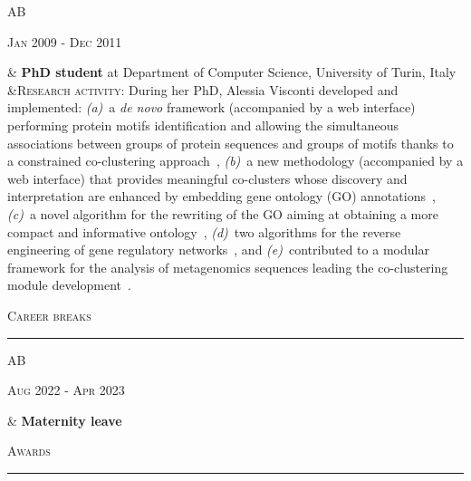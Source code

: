 \documentclass[a4paper,10pt]{article}
\newcommand{\mediumtitle}[1]{
	\vspace{0.2cm}
	{\noindent
	\Large \textsc{#1}\\[-2ex]
	\hrule
	\vspace{0.2cm}}
}
\newenvironment{doubletablelist}
{
	\vspace{-0.2cm}
	\begin{longtable}[!h]{AB}}{\end{longtable}
}
\newcommand{\dtlist}[2]{
\hspace{-3cm}
\noindent
	\begin{minipage}{0.22\textwidth}
	\begin{flushright}
	\textsc{#1}
	\end{flushright}
	\end{minipage}
	& #2\\[0.2cm]
}
\begin{document}
\begin{doubletablelist}
	\dtlist{Jan 2009 - Dec 2011}{\textbf{PhD student} at Department of Computer Science, University of Turin, Italy \\
	  &\textsc{Research activity}: During her PhD, Alessia Visconti developed and implemented: \emph{(a)}~a \emph{de novo} framework (accompanied by a web interface) performing protein motifs identification and allowing the simultaneous associations between groups of protein sequences and groups of motifs thanks to a constrained co-clustering approach~\cite{Cor09a}, \emph{(b)}~a new methodology (accompanied by a web interface) that provides meaningful co-clusters whose discovery and interpretation are enhanced by embedding gene ontology (GO) annotations~\cite{Vis11c,Cor09b}, \emph{(c)}~a novel algorithm for the rewriting of the GO aiming at obtaining a more compact and informative ontology~\cite{Vis11a,Vis10a}, \emph{(d)}~two algorithms for the reverse engineering of gene regulatory networks~\cite{Vis11b,Mar12,Vis12b}, and \emph{(e)}~contributed to a modular framework for the analysis of metagenomics sequences leading the co-clustering module development~\cite{Bon11}. %
	}
\end{doubletablelist}

\mediumtitle{Career breaks}
\begin{doubletablelist}
    \dtlist{Aug 2022 - Apr 2023}{\textbf{Maternity leave}
	}
\end{doubletablelist}

\mediumtitle{Awards}
\end{document}
